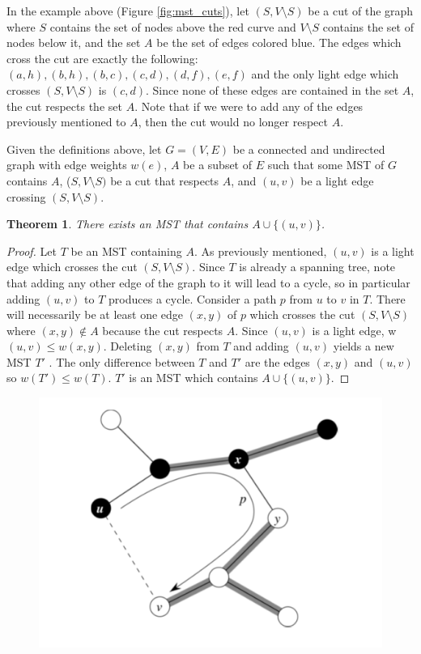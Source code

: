 \documentclass [12pt]{article}
\newtheorem{theorem}{Theorem}
\theoremstyle{definition}
\begin{document}
In the example above (Figure \ref{fig:mst_cuts}), let $(S, V \setminus S)$ be a cut of the graph where $S$ contains the set of nodes above the red curve and $V \setminus S$ contains the set of nodes below it, and the set $A$ be the set of edges colored blue. The edges which cross the cut are exactly the following: $(a, h), (b, h), (b, c), (c, d), (d, f ), (e, f )$ and the only light edge which crosses $(S, V \setminus S)$ is $(c, d)$. Since none of these edges are contained in the set $A$, the cut respects the set $A$. Note that if we were to add any of the edges previously mentioned to $A$, then the cut would
no longer respect $A$.

Given the definitions above, let $G = (V, E)$ be a connected and undirected graph with edge weights $w(e)$, $A$ be a subset of $E$ such that some MST of $G$ contains $A$, ($S, V \setminus S)$ be a cut that respects $A$, and $(u, v )$ be a light edge crossing $(S, V \setminus S)$.

\begin{theorem}
There exists an MST that contains $A \cup \{(u,v)\}$.
\label{thm:lemma}
\end{theorem}

\begin{proof} 
Let $T$ be an MST containing $A$. As previously mentioned, $(u, v )$ is a light edge which crosses the cut $(S, V \setminus S)$. Since $T$ is already a spanning tree, note that adding any other edge of the graph to it will lead to a cycle, so in particular adding $(u, v )$ to $T$ produces a cycle. Consider a path $p$ from $u$ to $v$ in $T$. There will necessarily be at least one edge $(x, y )$ of $p$ which crosses the cut $(S, V \setminus S)$ where $(x, y ) \notin A$ because the cut respects $A$. Since $(u, v )$ is a light edge, w$(u, v ) \leq w(x, y )$. Deleting $(x, y )$ from $T$ and adding $(u, v )$ yields a new MST $T'$ . The only difference between $T$ and $T'$ are the edges $(x, y )$ and $(u, v )$ so $w(T') \leq w(T)$. $T'$ is an MST which contains $A \cup \{(u, v )\}$.
\end{proof}

\begin{figure}[h!]
\includegraphics[scale=0.5]{mst_proof.png}
\end{figure}
 
\end{document}
